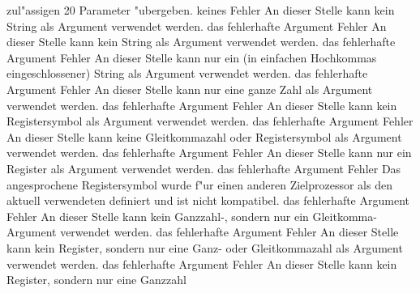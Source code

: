 \documentclass[12pt,a4paper,twoside]{report}
\begin{document}
\begin{description}
{                zul"assigen 20 Parameter "ubergeben.}
               {keines}
               {Fehler}
               {An dieser Stelle kann kein String als Argument
                verwendet werden.}
               {das fehlerhafte Argument}
               {Fehler}
               {An dieser Stelle kann kein String als Argument
                verwendet werden.}
               {das fehlerhafte Argument}
               {Fehler}
               {An dieser Stelle kann nur ein (in einfachen Hochkommas
                eingeschlossener) String als Argument verwendet werden.}
               {das fehlerhafte Argument}
               {Fehler}
               {An dieser Stelle kann nur eine ganze Zahl als Argument
                verwendet werden.}
               {das fehlerhafte Argument}
               {Fehler}
               {An dieser Stelle kann kein Registersymbol als Argument verwendet werden.}
               {das fehlerhafte Argument}
               {Fehler}
               {An dieser Stelle kann keine Gleitkommazahl oder Registersymbol als Argument verwendet werden.}
               {das fehlerhafte Argument}
               {Fehler}
               {An dieser Stelle kann nur ein Register als Argument verwendet werden.}
               {das fehlerhafte Argument}
               {Fehler}
               {Das angesprochene Registersymbol wurde f"ur einen anderen Zielprozessor
                als den aktuell verwendeten definiert und ist nicht kompatibel.}
               {das fehlerhafte Argument}
               {Fehler}
               {An dieser Stelle kann kein Ganzzahl-, sondern nur ein Gleitkomma-
                Argument verwendet werden.}
               {das fehlerhafte Argument}
               {Fehler}
               {An dieser Stelle kann kein Register, sondern nur eine Ganz-
                oder Gleitkommazahl als Argument verwendet werden.}
               {das fehlerhafte Argument}
               {Fehler}
               {An dieser Stelle kann kein Register, sondern nur eine Ganzzahl
}
\end{description}
\end{document}
